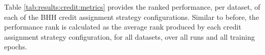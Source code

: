 Table \ref{tab:results:credit:metrics} provides the ranked performance, per dataset, of each of the \acs{BHH} credit assignment strategy configurations. Similar to before, the performance rank is calculated as the average rank produced by each credit assignment strategy configuration, for all datasets, over all runs and all training epochs.

\begin{table}[H]
	\centering
	\caption{Empirical results showing average rank and statistics for different credit assignment strategies used by the \acs{BHH} across multiple datasets, for all runs and epochs.}
	\label{tab:results:credit:metrics}%
	\par\bigskip
\end{table}
